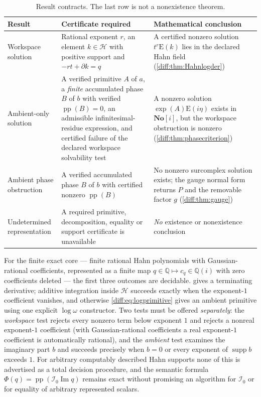 \documentclass[11pt,letterpaper]{article}
\numberwithin{equation}{section}
\theoremstyle{definition}
\theoremstyle{remark}
\newcommand{\SC}{\mathbf{No}[i]}
\newcommand{\Q}{\mathbb Q}
\newcommand{\der}{\partial}
\newcommand{\Izero}{\mathcal I_{0}}
\newcommand{\pp}{\operatorname{pp}}
\newcommand{\supp}{\operatorname{supp}}
\newcommand{\Imm}{\operatorname{Im}}
\newcommand{\Emm}{\mathrm{E}}
\newcommand{\Hring}{\mathscr H}
\begin{document}
\begin{table}[htbp]
\centering\small
\caption{Result contracts. The last row is not a nonexistence theorem.}
\label{diff:tab:outcomes}
\begin{tabularx}{\textwidth}{@{}L{0.22\textwidth}YL{0.26\textwidth}@{}}
\toprule
Result & Certificate required & Mathematical conclusion \\
\midrule
Workspace solution &
Rational exponent $r$, an element $k\in\Hring$ with positive support and
$-rt+\der k=q$ &
A certified nonzero solution $t^{r}\Emm(k)$ lies in the declared Hahn field
(\cref{diff:thm:Hahnlogder}) \\[0.4em]
Ambient-only solution &
A verified primitive $A$ of $a$, a \emph{finite} accumulated phase $B$ of $b$
with verified $\pp(B)=0$, an admissible infinitesimal-residue expression,
and certified failure of the declared workspace solvability test &
A nonzero solution $\exp(A)\Emm(i\eta)$ exists in $\SC$, but the workspace
obstruction is nonzero (\cref{diff:thm:phasecriterion}) \\[0.4em]
Ambient phase obstruction &
A verified accumulated phase $B$ of $b$ with certified nonzero $\pp(B)$ &
No nonzero surcomplex solution exists; the gauge normal form returns $P$ and
the removable factor $g$ (\cref{diff:thm:gauge}) \\[0.4em]
Undetermined representation &
A required primitive, decomposition, equality or support certificate is
unavailable &
\emph{No} existence or nonexistence conclusion \\
\bottomrule
\end{tabularx}
\end{table}

For the finite exact core --- finite rational Hahn polynomials with
Gaussian-rational coefficients, represented as a finite map
$q\in\Q\mapsto c_{q}\in\Q(i)$ with zero coefficients deleted --- the first
three outcomes are decidable.  gives a terminating
derivative; additive integration inside $\Hring$ succeeds exactly when the
exponent-$1$ coefficient vanishes, and otherwise
\cref{diff:eq:logprimitive} gives an ambient primitive using one explicit
$\log\omega$ constructor. Two tests must be offered \emph{separately}: the
\emph{workspace} test rejects every nonzero term below exponent $1$ and
rejects a nonreal exponent-$1$ coefficient (with Gaussian-rational
coefficients a real exponent-$1$ coefficient is automatically rational), and
the \emph{ambient} test examines the imaginary part $b$ and succeeds precisely
when $b=0$ or every exponent of $\supp b$ exceeds $1$. For arbitrary
computably described Hahn supports none of this is advertised as a total
decision procedure, and the semantic formula $\Phi(q)=\pp(\Izero\Imm q)$
remains exact without promising an algorithm for $\Izero$ or for equality of
arbitrary represented scalars.
\end{document}
